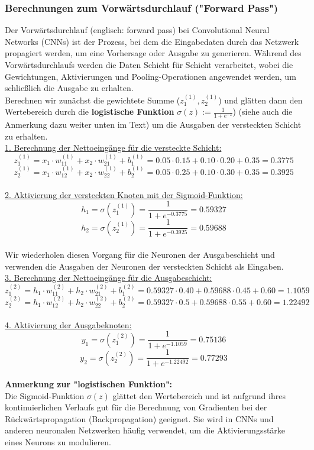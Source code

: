 \documentclass[12pt]{article}
\begin{document}
\subsubsection{Berechnungen zum Vorwärtsdurchlauf ("Forward Pass")}
Der Vorwärtsdurchlauf (englisch: forward pass) bei Convolutional Neural Networks (CNNs) ist der Prozess, bei dem die Eingabedaten durch das Netzwerk propagiert werden, um eine Vorhersage oder Ausgabe zu generieren. Während des Vorwärtsdurchlaufs werden die Daten Schicht für Schicht verarbeitet, wobei die Gewichtungen, Aktivierungen und Pooling-Operationen angewendet werden, um schließlich die Ausgabe zu erhalten.\\
Berechnen wir zunächst die gewichtete Summe ($z^{(1)}_1, z^{(1)}_2$) und glätten dann den  Wertebereich durch die \textbf{logistische Funktion} $\sigma(z) := \frac{1}{1 + e^{-z}}$) (siehe auch die Anmerkung dazu weiter unten im Text) um die Ausgaben der versteckten Schicht zu erhalten.\\[0.4cm]
\underline{1. Berechnung der Nettoeingänge für die versteckte Schicht:}
\[
z^{(1)}_1 = x_1 \cdot w^{(1)}_{11} + x_2 \cdot w^{(1)}_{21} + b^{(1)}_1 = 0.05 \cdot 0.15 + 0.10 \cdot 0.20 + 0.35 = 0.3775
\]
\[
z^{(1)}_2 = x_1 \cdot w^{(1)}_{12} + x_2 \cdot w^{(1)}_{22} + b^{(1)}_2 = 0.05 \cdot 0.25 + 0.10 \cdot 0.30 + 0.35 = 0.3925
\]\\
%
\underline{2. Aktivierung der versteckten Knoten mit der Sigmoid-Funktion:}
\[
h_1 = \sigma(z^{(1)}_1) = \frac{1}{1 + e^{-0.3775}} = 0.59327
\]
\[
h_2 = \sigma(z^{(1)}_2) = \frac{1}{1 + e^{-0.3925}} = 0.59688
\]\\
Wir wiederholen diesen Vorgang für die Neuronen der Ausgabeschicht und verwenden die Ausgaben der Neuronen der versteckten Schicht als Eingaben. \\[0.4cm]
%
\underline{3. Berechnung der Nettoeingänge für die Ausgabeschicht:}
\[
z^{(2)}_1 = h_1 \cdot w^{(2)}_{11} + h_2 \cdot w^{(2)}_{21} + b^{(2)}_1 = 0.59327 \cdot 0.40 + 0.59688 \cdot 0.45 + 0.60 = 1.1059
\]
\[
z^{(2)}_2 = h_1 \cdot w^{(2)}_{12} + h_2 \cdot w^{(2)}_{22} + b^{(2)}_2 = 0.59327 \cdot 0.
	5 + 0.59688 \cdot 0.55 + 0.60 = 1.22492
\]\\
%
\underline{4. Aktivierung der Ausgabeknoten:}
\[
y_1 = \sigma(z^{(2)}_1) = \frac{1}{1 + e^{-1.1059}} = 0.75136
\]
\[
y_2 = \sigma(z^{(2)}_2) = \frac{1}{1 + e^{-1.22492}} = 0.77293
\]
\\
\textbf{Anmerkung zur "logistischen Funktion":}
\\Die Sigmoid-Funktion $\sigma(z)$  glättet den Wertebereich und ist aufgrund ihres kontinuierlichen Verlaufs gut für die Berechnung von Gradienten bei der Rückwärtspropagation (Backpropagation) geeignet. Sie wird in CNNs und anderen neuronalen Netzwerken häufig verwendet, um die Aktivierungsstärke eines Neurons zu modulieren.\\
\end{document}
